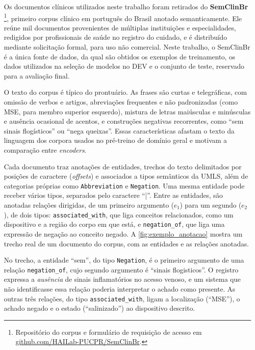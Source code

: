 Os documentos clínicos utilizados neste trabalho foram retirados do
\textbf{SemClinBr} \cite{oliveira_2022_semclinbr}\footnote{Repositório do corpus e
formulário de requisição de acesso em
\href{https://github.com/HAILab-PUCPR/SemClinBr}{github.com/HAILab-PUCPR/SemClinBr}.},
primeiro corpus clínico em português do Brasil anotado semanticamente. Ele reúne mil
documentos provenientes de múltiplas instituições e especialidades, redigidos por
profissionais de saúde no registro do cuidado, e é distribuído mediante solicitação
formal, para uso não comercial. Neste trabalho, o SemClinBr é a única fonte de dados, da qual são obtidos os exemplos de treinamento, os dados utilizados na seleção de modelos no DEV e o conjunto de teste, reservado para a avaliação final.

O texto do corpus é típico do prontuário. As frases são curtas e telegráficas, com
omissão de verbos e artigos, abreviações frequentes e não padronizadas (como MSE,
para membro superior esquerdo), mistura de letras maiúsculas e minúsculas e ausência
ocasional de acentos, e construções negativas recorrentes, como ``sem sinais
flogísticos'' ou ``nega queixas''. Essas características afastam o texto da
linguagem dos corpora usados no pré-treino de domínio geral e motivam a comparação
entre \emph{encoders}.

Cada documento traz anotações de entidades, trechos do texto delimitados
por posições de caractere (\emph{offsets}) e associados a tipos semânticos da UMLS,
além de categorias próprias como \texttt{Abbreviation} e \texttt{Negation}. Uma mesma entidade pode receber vários tipos, separados pelo caractere ``|''. Entre as entidades,
são anotadas relações dirigidas, de um primeiro argumento ($e_1$) para um
segundo ($e_2$), de dois tipos: \texttt{associated\_with}, que liga conceitos
relacionados, como um dispositivo e a região do corpo em que está, e
\texttt{negation\_of}, que liga uma expressão de negação ao conceito negado. A
\autoref{fig:exemplo_anotacao} mostra um trecho real de um documento do corpus, com
as entidades e as relações anotadas.



No trecho, a entidade ``sem'', do tipo \texttt{Negation}, é o primeiro argumento de uma relação \texttt{negation\_of}, cujo segundo argumento é ``sinais flogisticos''. O registro expressa a \emph{ausência} de sinais inflamatórios no acesso venoso, e um sistema que não identificasse essa relação poderia interpretar o achado como presente. As outras três
relações, do tipo \texttt{associated\_with}, ligam a localização (``MSE''), o achado
negado e o estado (``salinizado'') ao dispositivo descrito.

